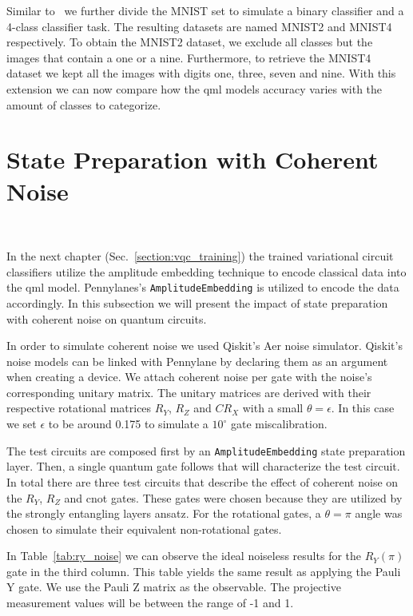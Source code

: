 Similar to~\cite{lu_quantum_2020} we further divide the MNIST
set to simulate a binary classifier and a 4-class classifier task. The
resulting datasets are named MNIST2 and MNIST4 respectively. To obtain
the MNIST2 dataset, we exclude all classes but the images that contain
a one or a nine. Furthermore, to retrieve the MNIST4 dataset we kept
all the images with digits one, three, seven and nine. With this extension
we can now compare how the \ac{qml} models accuracy varies with the
amount of classes to categorize. \

\section{State Preparation with Coherent Noise}\label{section:state_preparation_noise} \

In the next chapter (Sec.~\ref{section:vqc_training}) the trained variational circuit classifiers
utilize the amplitude embedding technique to encode classical data
into the \ac{qml} model. Pennylanes's \colorbox{inline_gray}{\lstinline|AmplitudeEmbedding|}
is utilized to encode the data accordingly. In this subsection we will
present the impact of state preparation with coherent noise on quantum
circuits. \

In order to simulate coherent noise we used Qiskit's Aer noise simulator.
Qiskit's noise models can be linked with Pennylane by declaring them as
an argument when creating a device. We attach coherent noise per gate
with the noise's corresponding unitary matrix. The unitary matrices are
derived with their respective rotational matrices \(R_{Y}\), \(R_{Z}\) and 
\(CR_{X}\) with a small \(\theta = \epsilon\). In this case we set 
\(\epsilon\) to be around 0.175 to simulate a \(10^{\circ}\) gate
miscalibration. \

The test circuits are composed first by an
\colorbox{inline_gray}{\lstinline|AmplitudeEmbedding|} state preparation
layer. Then, a single quantum gate follows that will characterize the
test circuit. In total there are three test circuits that describe the
effect of coherent noise on the \(R_{Y}\), \(R_{Z}\) and \ac{cnot} gates.
These gates were chosen because they are utilized by the strongly
entangling layers ansatz. For the rotational gates, a \(\theta = \pi\)
angle was chosen to simulate their equivalent non-rotational gates. \

In Table~\ref{tab:ry_noise} we can observe the ideal noiseless results
for the \(R_{Y}(\pi)\) gate in the third column. This table yields the
same result as applying the Pauli Y gate. We use the Pauli Z matrix as
the observable. The projective measurement values will be between the
range of -1 and 1. \

